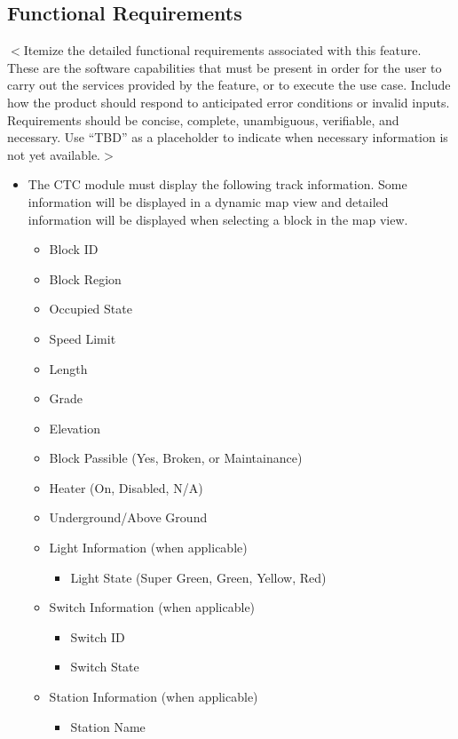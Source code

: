\documentclass{scrreprt}
\begin{document}
\subsection{Functional Requirements}
$<$Itemize the detailed functional requirements associated with this feature.  
These are the software capabilities that must be present in order for the user 
to carry out the services provided by the feature, or to execute the use case.  
Include how the product should respond to anticipated error conditions or 
invalid inputs. Requirements should be concise, complete, unambiguous, 
verifiable, and necessary. Use “TBD” as a placeholder to indicate when necessary 
information is not yet available.$>$
\begin{itemize}
  \item The CTC module must display the following track information. Some information 
  will be displayed in a dynamic map view and detailed information will be displayed 
  when selecting a block in the map view.  
  \begin{itemize}
    \item Block ID
	\item Block Region
	\item Occupied State
	\item Speed Limit
	\item Length
	\item Grade
	\item Elevation
	\item Block Passible (Yes, Broken, or Maintainance)
	\item Heater (On, Disabled, N/A)
	\item Underground/Above Ground
	\item Light Information (when applicable)
	\begin{itemize}
	  \item Light State (Super Green, Green, Yellow, Red)
	\end{itemize}
	\item Switch Information (when applicable)
	\begin{itemize}
	  \item Switch ID
	  \item Switch State
	\end{itemize}
	\item Station Information (when applicable)
	\begin{itemize}
	  \item Station Name

\end{itemize}
\end{itemize}
\end{itemize}
\end{document}
